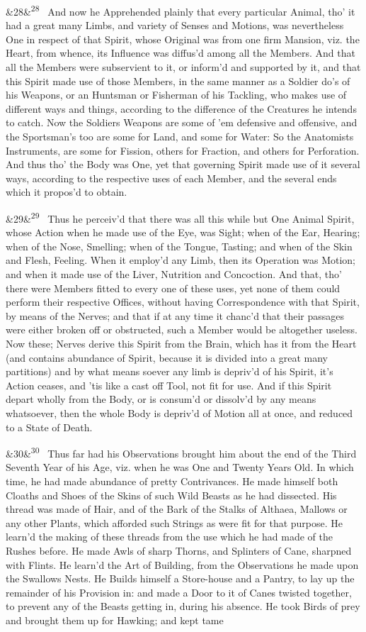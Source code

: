 \documentclass[12pt]{article}
\newcommand{\para}[1][]{\par\noindent\ifx&#1&\else\textsuperscript{\footnotesize #1}~\fi}
\begin{document}
\para[28] And now he Apprehended plainly that every particular Animal, tho' it had a great many Limbs, and variety of Senses and Motions, was nevertheless One in respect of that Spirit, whose Original was from one firm Mansion, viz. the Heart, from whence, its Influence was diffus'd among all the Members. And that all the Members were subservient to it, or inform'd and supported by it, and that this Spirit made use of those Members, in the same manner as a Soldier do's of his Weapons, or an Huntsman or Fisherman of his Tackling, who makes use of different ways and things, according to the difference of the Creatures he intends to catch. Now the Soldiers Weapons are some of 'em defensive and offensive, and the Sportsman's too are some for Land, and some for Water: So the Anatomists Instruments, are some for Fission, others for Fraction, and others for Perforation. And thus tho' the Body was One, yet that governing Spirit made use of it several ways, according to the respective uses of each Member, and the several ends which it propos'd to obtain.

\para[29] Thus he perceiv'd that there was all this while but One Animal Spirit, whose Action when he made use of the Eye, was Sight; when of the Ear, Hearing; when of the Nose, Smelling; when of the Tongue, Tasting; and when of the Skin and Flesh, Feeling. When it employ'd any Limb, then its Operation was Motion; and when it made use of the Liver, Nutrition and Concoction. And that, tho' there were Members fitted to every one of these uses, yet none of them could perform their respective Offices, without having Correspondence with that Spirit, by means of the Nerves; and that if at any time it chanc'd that their passages were either broken off or obstructed, such a Member would be altogether useless. Now these; Nerves derive this Spirit from the Brain, which has it from the Heart (and contains abundance of Spirit, because it is divided into a great many partitions) and by what means soever any limb is depriv'd of his Spirit, it's Action ceases, and 'tis like a cast off Tool, not fit for use. And if this Spirit depart wholly from the Body, or is consum'd or dissolv'd by any means whatsoever, then the whole Body is depriv'd of Motion all at once, and reduced to a State of Death.

\para[30] Thus far had his Observations brought him about the end of the Third Seventh Year of his Age, viz. when he was One and Twenty Years Old. In which time, he had made abundance of pretty Contrivances. He made himself both Cloaths and Shoes of the Skins of such Wild Beasts as he had dissected. His thread was made of Hair, and of the Bark of the Stalks of Althaea, Mallows or any other Plants, which afforded such Strings as were fit for that purpose. He learn'd the making of these threads from the use which he had made of the Rushes before. He made Awls of sharp Thorns, and Splinters of Cane, sharpned with Flints. He learn'd the Art of Building, from the Observations he made upon the Swallows Nests. He Builds himself a Store-house and a Pantry, to lay up the remainder of his Provision in: and made a Door to it of Canes twisted together, to prevent any of the Beasts getting in, during his absence. He took Birds of prey and brought them up for Hawking; and kept tame
\end{document}
